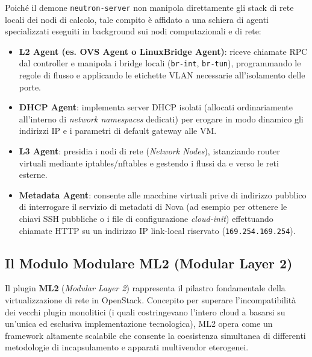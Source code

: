 \documentclass[11pt, a4paper]{article}
\begin{document}
Poiché il demone \texttt{neutron-server} non manipola direttamente gli stack di rete locali dei nodi di calcolo, tale compito è affidato a una schiera di agenti specializzati eseguiti in background sui nodi computazionali e di rete:
\begin{itemize}[leftmargin=*]
    \item \textbf{L2 Agent (es. OVS Agent o LinuxBridge Agent)}: riceve chiamate RPC dal controller e manipola i bridge locali (\texttt{br-int}, \texttt{br-tun}), programmando le regole di flusso e applicando le etichette VLAN necessarie all'isolamento delle porte.
    \item \textbf{DHCP Agent}: implementa server DHCP isolati (allocati ordinariamente all'interno di \emph{network namespaces} dedicati) per erogare in modo dinamico gli indirizzi IP e i parametri di default gateway alle VM.
    \item \textbf{L3 Agent}: presidia i nodi di rete (\emph{Network Nodes}), istanziando router virtuali mediante iptables/nftables e gestendo i flussi da e verso le reti esterne.
    \item \textbf{Metadata Agent}: consente alle macchine virtuali prive di indirizzo pubblico di interrogare il servizio di metadati di Nova (ad esempio per ottenere le chiavi SSH pubbliche o i file di configurazione \emph{cloud-init}) effettuando chiamate HTTP su un indirizzo IP link-local riservato (\texttt{169.254.169.254}).
\end{itemize}

\newpage

\subsection{Il Modulo Modulare ML2 (Modular Layer 2)}

Il plugin \textbf{ML2} (\emph{Modular Layer 2}) rappresenta il pilastro fondamentale della virtualizzazione di rete in OpenStack. Concepito per superare l'incompatibilità dei vecchi plugin monolitici (i quali costringevano l'intero cloud a basarsi su un'unica ed esclusiva implementazione tecnologica), ML2 opera come un framework altamente scalabile che consente la coesistenza simultanea di differenti metodologie di incapsulamento e apparati multivendor eterogenei.

\end{document}
